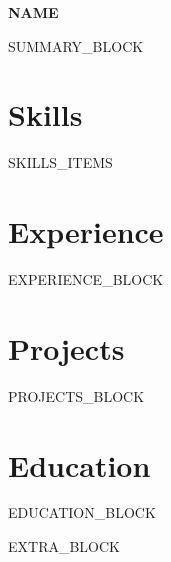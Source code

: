 \documentclass[11pt]{article}
\begin{document}
\begin{center}
{\LARGE \textbf{{{NAME}}}}
\end{center}

\vspace{0.5em}

{{SUMMARY_BLOCK}}

\section*{Skills}
\begin{itemize}
{{SKILLS_ITEMS}}
\end{itemize}

\section*{Experience}
{{EXPERIENCE_BLOCK}}

\section*{Projects}
{{PROJECTS_BLOCK}}

\section*{Education}
{{EDUCATION_BLOCK}}

{{EXTRA_BLOCK}}
\end{document}
